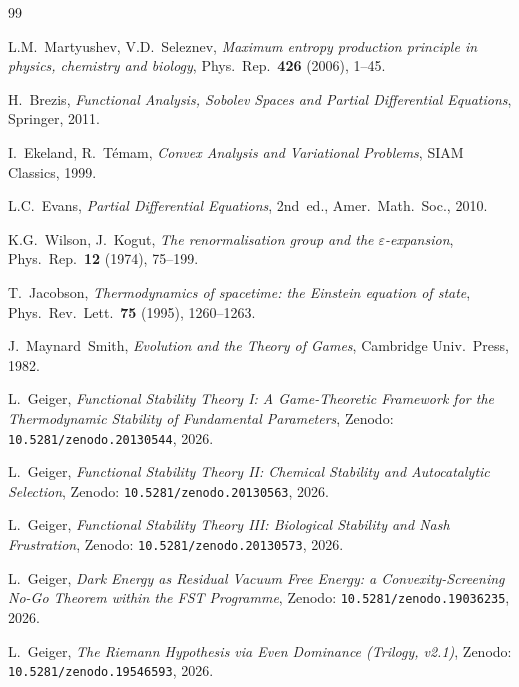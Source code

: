 \documentclass[11pt,a4paper]{article}
\theoremstyle{remark}
\begin{document}
\begin{thebibliography}{99}

L.M.~Martyushev, V.D.~Seleznev,
\emph{Maximum entropy production principle in physics, chemistry and biology},
Phys.~Rep.~\textbf{426} (2006), 1--45.

H.~Brezis,
\emph{Functional Analysis, Sobolev Spaces and Partial Differential Equations},
Springer, 2011.

I.~Ekeland, R.~T\'emam,
\emph{Convex Analysis and Variational Problems},
SIAM Classics, 1999.

L.C.~Evans,
\emph{Partial Differential Equations}, 2nd~ed.,
Amer.~Math.~Soc., 2010.

K.G.~Wilson, J.~Kogut,
\emph{The renormalisation group and the $\varepsilon$-expansion},
Phys.~Rep.~\textbf{12} (1974), 75--199.

T.~Jacobson,
\emph{Thermodynamics of spacetime: the Einstein equation of state},
Phys.~Rev.~Lett.~\textbf{75} (1995), 1260--1263.

J.~Maynard~Smith,
\emph{Evolution and the Theory of Games},
Cambridge Univ.~Press, 1982.

L.~Geiger,
\emph{Functional Stability Theory I: A Game-Theoretic Framework
for the Thermodynamic Stability of Fundamental Parameters},
Zenodo: \texttt{10.5281/zenodo.20130544}, 2026.

L.~Geiger,
\emph{Functional Stability Theory II: Chemical Stability and
Autocatalytic Selection},
Zenodo: \texttt{10.5281/zenodo.20130563}, 2026.

L.~Geiger,
\emph{Functional Stability Theory III: Biological Stability and
Nash Frustration},
Zenodo: \texttt{10.5281/zenodo.20130573}, 2026.

L.~Geiger,
\emph{Dark Energy as Residual Vacuum Free Energy: a Convexity-Screening
No-Go Theorem within the FST Programme},
Zenodo: \texttt{10.5281/zenodo.19036235}, 2026.

L.~Geiger,
\emph{The Riemann Hypothesis via Even Dominance (Trilogy, v2.1)},
Zenodo: \texttt{10.5281/zenodo.19546593}, 2026.


\end{thebibliography}
\end{document}
